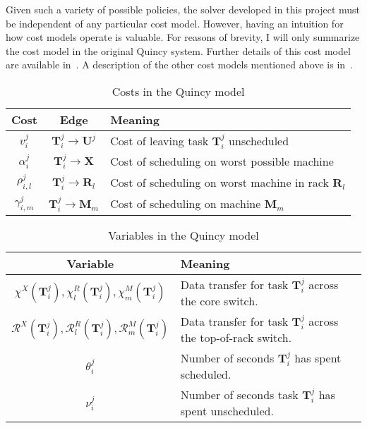 Given such a variety of possible policies, the solver developed in this project must be independent of any particular cost model. However, having an intuition for how cost models operate is valuable. For reasons of brevity, I will only summarize the cost model in the original Quincy system. Further details of this cost model are available in~\cite{Isard:2009}. A description of the other cost models mentioned above is in~\cite[ch.~5]{Schwarzkopf:2015}.

\begin{table}
    \begin{tabular}{c|c|l}
        \hline 
        Cost & Edge & Meaning\tabularnewline
        \hline 
        \hline 
        $v_{i}^{j}$ & $\mathbf{T}_{i}^{j}\to\mathbf{U}^{j}$ & Cost of leaving task $\mathbf{T}_{i}^{j}$ unscheduled\tabularnewline
        \hline 
        $\alpha_{i}^{j}$ & $\mathbf{T}_{i}^{j}\to\mathbf{X}$ & Cost of scheduling on worst possible machine\tabularnewline
        \hline 
        $\rho_{i,l}^{j}$ & $\mathbf{T}_{i}^{j}\to\mathbf{R}_{l}$ & Cost of scheduling on worst machine in rack $\mathbf{R}_{l}$\tabularnewline
        \hline 
        $\gamma_{i,m}^{j}$ & $\mathbf{T}_{i}^{j}\to\mathbf{M}_{m}$ & Cost of scheduling on machine $\mathbf{M}_{m}$\tabularnewline
        \hline 
    \end{tabular}
    \caption{Costs in the Quincy model}
    \label{table:quincy-costs}
\end{table}

\begin{table}
    \begin{tabular}{c|l}
        \hline 
        Variable & Meaning\tabularnewline
        \hline 
        $\chi^{X}\left(\mathbf{T}_{i}^{j}\right),\chi_{l}^{R}\left(\mathbf{T}_{i}^{j}\right),\chi_{m}^{M}\left(\mathbf{T}_{i}^{j}\right)$ & Data transfer for task $\mathbf{T}_{i}^{j}$ across the core switch.\tabularnewline %
        $\mathcal{R}^{X}\left(\mathbf{T}_{i}^{j}\right),\mathcal{R}_{l}^{R}\left(\mathbf{T}_{i}^{j}\right),\mathcal{R}_{m}^{M}\left(\mathbf{T}_{i}^{j}\right)$ & Data transfer for task $\mathbf{T}_{i}^{j}$ across the top-of-rack switch.\tabularnewline
        $\theta_{i}^{j}$ & Number of seconds $\mathbf{T}_{i}^{j}$ has spent scheduled.\tabularnewline
        $\nu_{i}^{j}$ & Number of seconds task $\mathbf{T}_{i}^{j}$ has spent unscheduled.\tabularnewline
        \hline
    \end{tabular}
    \caption{Variables in the Quincy model}
    \label{table:quincy-variables}
\end{table}

